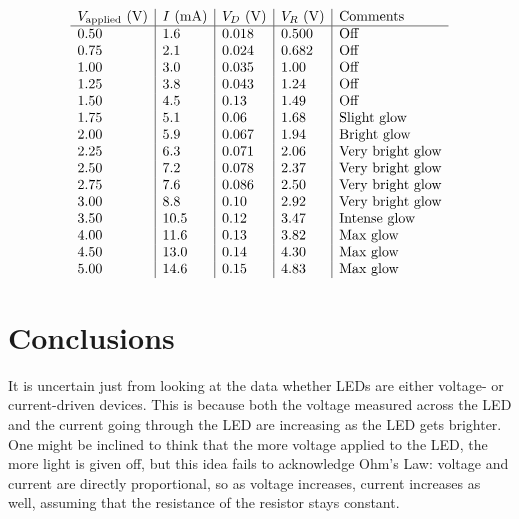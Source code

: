 \documentclass{article}
\begin{document}
\begin{equation*}
\begin{array}{l | l | l | l | l}
        
    V_\text{applied} \text{ (\si{V})} & I \text{ (\si{mA})} & V_D\text{ (\si{V})} & V_R \text{ (\si{V})} & \text{Comments}\\ \hline
    0.50 & 1.6 & 0.018& 0.500& \text{Off}\\
    0.75 & 2.1 & 0.024& 0.682& \text{Off}\\
    1.00 & 3.0 & 0.035& 1.00 & \text{Off}\\
    1.25 & 3.8 & 0.043& 1.24 & \text{Off}\\
    1.50 & 4.5 & 0.13 & 1.49 & \text{Off}\\
    1.75 & 5.1 & 0.06 & 1.68 & \text{Slight glow}\\
    2.00 & 5.9 & 0.067& 1.94 & \text{Bright glow}\\
    2.25 & 6.3 & 0.071& 2.06 & \text{Very bright glow}\\
    2.50 & 7.2 & 0.078& 2.37 & \text{Very bright glow}\\
    2.75 & 7.6 & 0.086& 2.50 & \text{Very bright glow}\\
    3.00 & 8.8 & 0.10 & 2.92 & \text{Very bright glow}\\
    3.50 &10.5 & 0.12 & 3.47 & \text{Intense glow}\\
    4.00 &11.6 & 0.13 & 3.82 & \text{Max glow}\\
    4.50 &13.0 & 0.14 & 4.30 & \text{Max glow}\\
    5.00 &14.6 & 0.15 & 4.83 & \text{Max glow}
    
\end{array}
\end{equation*}

\section{Conclusions} It is uncertain just from looking at
the data whether LEDs are either voltage- or current-driven
devices. This is because both the voltage measured across
the LED and the current going through the LED are increasing
as the LED gets brighter. One might be inclined to think that the more voltage
applied to the LED, the more light is given off, but this idea
fails to acknowledge Ohm's Law: voltage and current are directly
proportional, so as voltage increases, current increases as well,
assuming that the resistance of the resistor stays constant.
\end{document}
